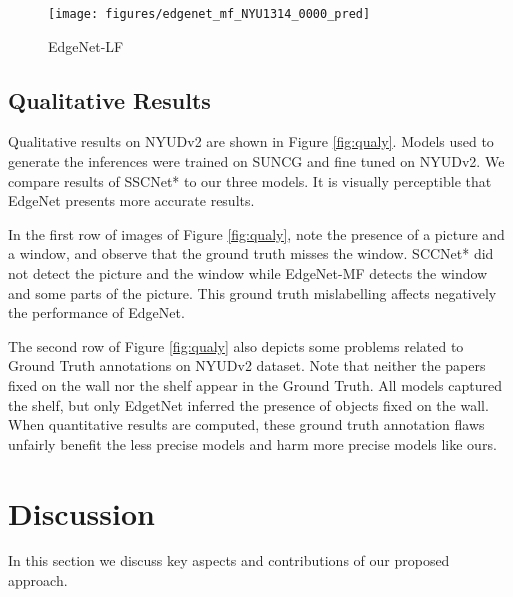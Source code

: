 \begin{figure*}[ht]
\begin{subfigure}{0.16\textwidth}
\end{subfigure}
\begin{subfigure}{0.16\textwidth}
\texttt{[image: figures/edgenet\_mf\_NYU1314\_0000\_pred]}
\caption{EdgeNet-LF}

\end{subfigure}



















\caption{\textbf{Qualitative Results}. We compare EdgeNet results using SSCNet* as a baseline on SUNCG and NYUDv2. Overall, EdgeNet gives more accurate voxel predictions, especially for hard to detect clases (best viewed in colour).}
\label{fig:qualy}
\end{figure*}



\subsection{Qualitative Results}
\label{sec:qualy}
Qualitative results on NYUDv2 are shown in Figure \ref{fig:qualy}.  Models used to generate the inferences were trained on SUNCG and fine tuned on NYUDv2.  We compare results of SSCNet* to our three models. It is visually perceptible that EdgeNet presents more accurate results.


In the first row of images of Figure \ref{fig:qualy}, note the presence of a picture and a window, and observe that the ground truth misses the window. SCCNet* did not detect the picture and the window while EdgeNet-MF detects the window and some parts of the picture. This ground truth mislabelling affects negatively the performance of EdgeNet.

The second row of Figure \ref{fig:qualy} also depicts some problems related to Ground Truth annotations on NYUDv2 dataset. Note that neither the papers fixed on the wall nor the shelf appear in the Ground Truth. All models captured the shelf, but only EdgetNet inferred the presence of objects fixed on the wall. When quantitative results are computed, these ground truth annotation flaws unfairly benefit the less precise models and harm more precise models like ours. 


\section {Discussion}
\label{sec:discussion}
 In this section we discuss key aspects and contributions of our proposed approach.

